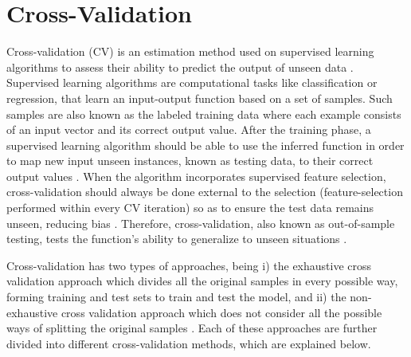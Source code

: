 \chapter{Cross-Validation}
\label{ch:cross-validation}

Cross-validation (CV) is an estimation method used on supervised learning algorithms to assess their ability to predict the output of unseen data \citep{varma2006bias,kohavi1995study}. Supervised learning algorithms are computational tasks like classification or regression, that learn an input-output function based on a set of samples. Such samples are also known as the labeled training data where each example consists of an input vector and its correct output value. After the training phase, a supervised learning algorithm should be able to use the inferred function in order to map new input unseen instances, known as testing data, to their correct output values \citep{caruana2006empirical}. When the algorithm incorporates supervised feature selection, cross-validation should always be done external to the selection (feature-selection performed within every CV iteration) so as to ensure the test data remains unseen, reducing bias \citep{ambroise2002selection, friedman2001elements}.  Therefore, cross-validation, also known as out-of-sample testing, tests the function's ability to generalize to unseen situations \citep{varma2006bias,kohavi1995study}. 

Cross-validation has two types of approaches, being i) the exhaustive cross validation approach which divides all the original samples in every possible way, forming training and test sets to train and test the model, and ii) the non-exhaustive cross validation approach which does not consider all the possible ways of splitting the original samples \citep{arlot2010survey}. Each of these approaches are further divided into different cross-validation methods, which are explained below.

